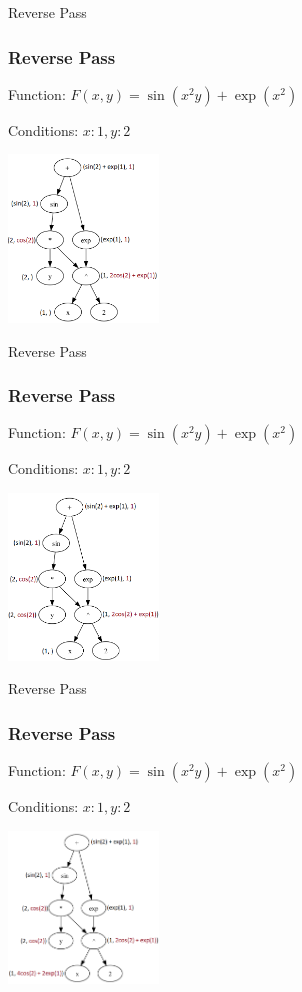 \documentclass{beamer}
\begin{document}
\begin{frame}{Reverse Pass}
\frametitle{Reverse Pass}

Function: $F(x, y) = \sin(x^2 y) + \exp(x^2)$

Conditions: ${x:1, y:2}$
\begin{center}
    \includegraphics[width=4cm]{DAG_gif_images/rv_1_fix_4.png}
\end{center}
\end{frame}

\begin{frame}{Reverse Pass}
\frametitle{Reverse Pass}

Function: $F(x, y) = \sin(x^2 y) + \exp(x^2)$

Conditions: ${x:1, y:2}$
\begin{center}
    \includegraphics[width=4cm]{DAG_gif_images/rv_1_fix_5.png}
\end{center}
\end{frame}

\begin{frame}{Reverse Pass}
\frametitle{Reverse Pass}

Function: $F(x, y) = \sin(x^2 y) + \exp(x^2)$

Conditions: ${x:1, y:2}$
\begin{center}
    \includegraphics[width=4cm]{DAG_gif_images/rv_1_fix_6.png}
\end{center}
\end{frame}
\end{document}
